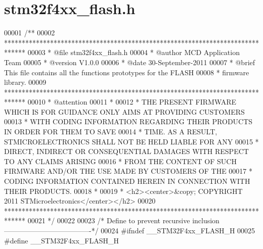 \section{stm32f4xx\+\_\+flash.\+h}
\label{stm32f4xx__flash_8h_source}

\begin{DoxyCode}
00001 \textcolor{comment}{/**}
00002 \textcolor{comment}{  ******************************************************************************}
00003 \textcolor{comment}{  * @file    stm32f4xx\_flash.h}
00004 \textcolor{comment}{  * @author  MCD Application Team}
00005 \textcolor{comment}{  * @version V1.0.0}
00006 \textcolor{comment}{  * @date    30-September-2011}
00007 \textcolor{comment}{  * @brief   This file contains all the functions prototypes for the FLASH }
00008 \textcolor{comment}{  *          firmware library.}
00009 \textcolor{comment}{  ******************************************************************************}
00010 \textcolor{comment}{  * @attention}
00011 \textcolor{comment}{  *}
00012 \textcolor{comment}{  * THE PRESENT FIRMWARE WHICH IS FOR GUIDANCE ONLY AIMS AT PROVIDING CUSTOMERS}
00013 \textcolor{comment}{  * WITH CODING INFORMATION REGARDING THEIR PRODUCTS IN ORDER FOR THEM TO SAVE}
00014 \textcolor{comment}{  * TIME. AS A RESULT, STMICROELECTRONICS SHALL NOT BE HELD LIABLE FOR ANY}
00015 \textcolor{comment}{  * DIRECT, INDIRECT OR CONSEQUENTIAL DAMAGES WITH RESPECT TO ANY CLAIMS ARISING}
00016 \textcolor{comment}{  * FROM THE CONTENT OF SUCH FIRMWARE AND/OR THE USE MADE BY CUSTOMERS OF THE}
00017 \textcolor{comment}{  * CODING INFORMATION CONTAINED HEREIN IN CONNECTION WITH THEIR PRODUCTS.}
00018 \textcolor{comment}{  *}
00019 \textcolor{comment}{  * <h2><center>&copy; COPYRIGHT 2011 STMicroelectronics</center></h2>}
00020 \textcolor{comment}{  ******************************************************************************}
00021 \textcolor{comment}{  */}
00022 
00023 \textcolor{comment}{/* Define to prevent recursive inclusion -------------------------------------*/}
00024 \textcolor{preprocessor}{#}\textcolor{preprocessor}{ifndef} \textcolor{preprocessor}{\_\_STM32F4xx\_FLASH\_H}
00025 \textcolor{preprocessor}{#}\textcolor{preprocessor}{define} \textcolor{preprocessor}{\_\_STM32F4xx\_FLASH\_H}

\end{DoxyCode}
